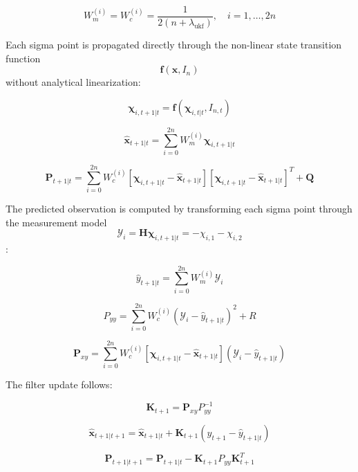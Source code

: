 \documentclass[preprint,12pt,authoryear]{elsarticle}
\theoremstyle{definition}
\begin{document}
$$W_m^{(i)} = W_c^{(i)} = \frac{1}{2(n + \lambda_{\text{ukf}})}, \quad i = 1, \dots, 2n$$

Each sigma point is propagated directly through the non-linear state transition function $$\mathbf{f}(\mathbf{x}, I_n)$$ without analytical linearization:

$$\boldsymbol{\chi}_{i, t+1|t} = \mathbf{f}(\boldsymbol{\chi}_{i, t|t}, I_{n,t})$$

$$\hat{\mathbf{x}}_{t+1|t} = \sum_{i=0}^{2n} W_m^{(i)} \boldsymbol{\chi}_{i, t+1|t}$$

$$\mathbf{P}_{t+1|t} = \sum_{i=0}^{2n} W_c^{(i)} \left[\boldsymbol{\chi}_{i, t+1|t} - \hat{\mathbf{x}}_{t+1|t}\right] \left[\boldsymbol{\chi}_{i, t+1|t} - \hat{\mathbf{x}}_{t+1|t}\right]^T + \mathbf{Q}$$

The predicted observation is computed by transforming each sigma point through the measurement model $$\mathcal{Y}_i = \mathbf{H} \boldsymbol{\chi}_{i, t+1|t} = -\chi_{i,1} - \chi_{i,2}$$:

$$\hat{y}_{t+1|t} = \sum_{i=0}^{2n} W_m^{(i)} \mathcal{Y}_i$$

$$P_{yy} = \sum_{i=0}^{2n} W_c^{(i)} (\mathcal{Y}_i - \hat{y}_{t+1|t})^2 + R$$

$$\mathbf{P}_{xy} = \sum_{i=0}^{2n} W_c^{(i)} \left[\boldsymbol{\chi}_{i, t+1|t} - \hat{\mathbf{x}}_{t+1|t}\right] (\mathcal{Y}_i - \hat{y}_{t+1|t})$$

The filter update follows:

$$\mathbf{K}_{t+1} = \mathbf{P}_{xy} P_{yy}^{-1}$$

$$\hat{\mathbf{x}}_{t+1|t+1} = \hat{\mathbf{x}}_{t+1|t} + \mathbf{K}_{t+1} (y_{t+1} - \hat{y}_{t+1|t})$$

$$\mathbf{P}_{t+1|t+1} = \mathbf{P}_{t+1|t} - \mathbf{K}_{t+1} P_{yy} \mathbf{K}_{t+1}^T$$
\end{document}
